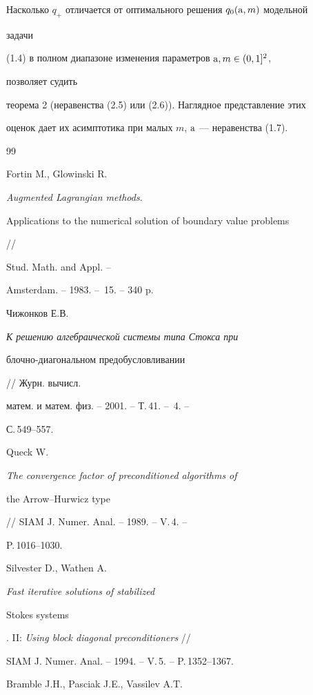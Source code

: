  


Насколько $q_+$ отличается от оптимального решения $q_0(\mathrm a,m)$ модельной 


задачи 


(1.4) в полном диапазоне изменения параметров $\mathrm a,m\in(0,1]^2$, 


позволяет судить 


теорема 2 (неравенства (2.5) или (2.6)). Наглядное представление этих 


оценок дает их асимптотика при малых $m$, $\mathrm a$ --- неравенства (1.7). 


 


 


\begin{thebibliography}{99} 


 




Fortin M., Glowinski R. {\em Augmented Lagrangian methods. 


Applications to the numerical solution of boundary value problems} // 


Stud. Math. and Appl. --


Amsterdam. -- 1983. -- \No\,15. -- 340 p. 




Чижонков Е.В. {\em К решению алгебраической системы типа Стокса при 


блочно-диагональном предобусловливании} // Журн. вычисл. 


матем. и матем. физ. -- 2001. -- Т.\,41. -- \No\,4. -- 


С.\,549--557. 




Queck W. {\em The convergence factor of preconditioned algorithms of 


the Arrow--Hurwicz type} // SIAM J. Numer. Anal. -- 1989. -- V.\,4. -- 


P.\,1016--1030. 




Silvester D., Wathen A. {\em Fast iterative solutions of stabilized 


Stokes systems}. II: {\em Using block diagonal preconditioners} // 


SIAM J. Numer. Anal. -- 1994. -- V.\,5. -- P.\,1352--1367. 




Bramble J.H., Pasciak J.E., Vassilev A.T. 



\end{thebibliography}
